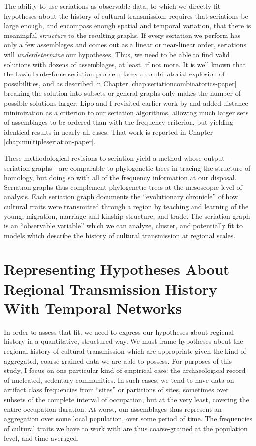     The ability to use seriations as observable data, to which we directly fit hypotheses about the history of cultural transmission, requires that seriations be large enough, and encompass enough spatial and temporal variation, that there is meaningful \emph{structure} to the resulting graphs.  If every seriation we perform has only a few assemblages and comes out as a linear or near-linear order, seriations will \emph{underdetermine} our hypotheses.  Thus, we need to be able to find valid solutions with dozens of assemblages, at least, if not more.  It is well known that the basic brute-force seriation problem faces a combinatorial explosion of possibilities, and as described in Chapter \ref{chap:seriationcombinatorics-paper} breaking the solution into subsets or general graphs only makes the number of possible solutions larger.  Lipo and I revisited earlier work by \citep{Kadane1971} and added distance minimization as a criterion to our seriation algorithms, allowing much larger sets of assemblages to be ordered than with the frequency criterion, but yielding identical results in nearly all cases.  That work is reported in Chapter \ref{chap:multipleseriation-paper}.  
    
    These methodological revisions to seriation yield a method whose output---seriation graphs---are comparable to phylogenetic trees in tracing the structure of homology, but doing so with all of the frequency information at our disposal.  Seriation graphs thus complement phylogenetic trees at the mesoscopic level of analysis.  Each seriation graph documents the ``evolutionary chronicle'' of how cultural traits were transmitted through a region by teaching and learning of the young, migration, marriage and kinship structure, and trade.  The seriation graph is an ``observable variable'' which we can analyze, cluster, and potentially fit to models which describe the history of cultural transmission at regional scales.
    
    
    
    \section{Representing Hypotheses About Regional Transmission History With Temporal Networks}\label{metapop:sec:temporal-networks}
    
    In order to assess that fit, we need to express our hypotheses about regional history in a quantitative, structured way.  
    We must frame hypotheses about the regional history of cultural transmission which are appropriate given the kind of aggregated, coarse-grained data we are able to possess.  For purposes of this study, I focus on one particular kind of empirical case:  the archaeological record of nucleated, sedentary communities.  In such cases, we tend to have data on artifact class frequencies from ``sites'' or partitions of sites, sometimes over subsets of the complete interval of occupation, but at the very least, covering the entire occupation duration.  At worst, our assemblages thus represent an aggregation over some local population, over some period of time.  The frequencies of cultural traits we have to work with are thus coarse-grained at the population level, and time averaged.  
    
